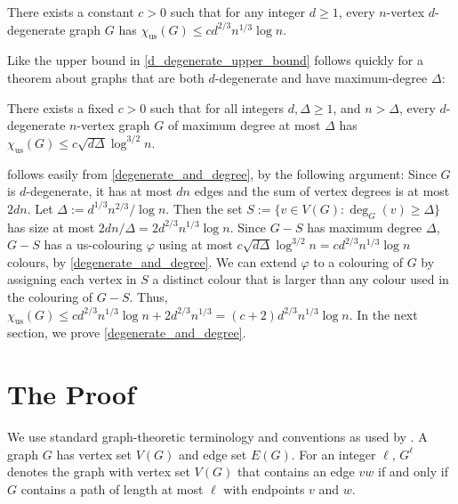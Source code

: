 \documentclass{patmorin}
\newcommand{\trn}{\chi_{\mathrm{us}}}
\begin{document}
\begin{thm}\label{d_degenerate_upper_bound}
  There exists a constant $c>0$ such that for any integer $d\ge 1$, every $n$-vertex $d$-degenerate graph $G$ has $\trn(G) \le c d^{2/3} n^{1/3}\log  n$.
\end{thm}

Like the upper bound in \cite{karpas.neiman.ea:on} \cref{d_degenerate_upper_bound} follows quickly for a theorem about graphs that are both $d$-degenerate and have maximum-degree $\Delta$:

\begin{thm}\label{degenerate_and_degree}
  There exists a fixed $c>0$ such that
  for all integers $d,\Delta \ge 1$, and $n> \Delta$, every $d$-degenerate $n$-vertex graph $G$ of maximum degree at most $\Delta$ has
  $\trn(G)\leq c \sqrt{d\Delta}\log^{3/2}  n$.
\end{thm}

 follows easily from \cref{degenerate_and_degree}, by the following argument:  Since $G$ is $d$-degenerate, it has at most $dn$ edges and the sum of vertex degrees is at most $2dn$.  Let $\Delta:=d^{1/3}n^{2/3}/\log n$.  Then the set $S:=\{v\in V(G):\deg_G(v)\ge \Delta\}$ has size at most $2dn/\Delta=2d^{2/3}n^{1/3}\log n$.  Since $G-S$ has maximum degree $\Delta$, $G-S$ has a us-colouring $\varphi$ using at most $c\sqrt{d\Delta}\log^{3/2} n = cd^{2/3}n^{1/3}\log  n$ colours, by \cref{degenerate_and_degree}. We can extend $\varphi$ to a colouring of $G$ by assigning each vertex in $S$ a distinct colour that is larger than any colour used in the colouring of $G-S$.  Thus, $\trn(G)\le cd^{2/3}n^{1/3}\log  n+2d^{2/3}n^{1/3}= (c+2)d^{2/3}n^{1/3}\log  n$.  In the next section, we prove \cref{degenerate_and_degree}.


\section{The Proof}

We use standard graph-theoretic terminology and conventions as used by \citet{diestel:graph}. A graph $G$ has vertex set $V(G)$ and edge set $E(G)$.  For an integer $\ell$, $G^\ell$ denotes the graph with vertex set $V(G)$ that contains an edge $vw$ if and only if $G$ contains a path of length at most $\ell$ with endpoints $v$ and $w$.
\end{document}
